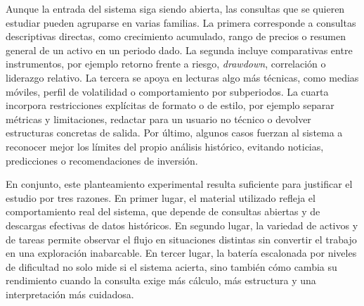Aunque la entrada del sistema siga siendo abierta, las consultas que se quieren estudiar pueden agruparse en varias familias. La primera corresponde a consultas 
descriptivas directas, como crecimiento acumulado, rango de precios o resumen general de un activo en un periodo dado. La segunda incluye comparativas entre instrumentos, 
por ejemplo retorno frente a riesgo, \textit{drawdown}, correlaci\'on o liderazgo relativo. La tercera se apoya en lecturas algo m\'as t\'ecnicas, como medias m\'oviles, 
perfil de volatilidad o comportamiento por subperiodos. La cuarta incorpora restricciones expl\'icitas de formato o de estilo, por ejemplo separar m\'etricas y 
limitaciones, redactar para un usuario no t\'ecnico o devolver estructuras concretas de salida. Por \'ultimo, algunos casos fuerzan al sistema a reconocer mejor los 
l\'imites del propio an\'alisis hist\'orico, evitando noticias, predicciones o recomendaciones de inversi\'on.

En conjunto, este planteamiento experimental resulta suficiente para justificar el estudio por tres razones. En primer lugar, el material utilizado refleja el 
comportamiento real del sistema, que depende de consultas abiertas y de descargas efectivas de datos hist\'oricos. En segundo lugar, la variedad de activos y de tareas 
permite observar el flujo en situaciones distintas sin convertir el trabajo en una exploraci\'on inabarcable. En tercer lugar, la bater\'ia escalonada por niveles de 
dificultad no solo mide si el sistema acierta, sino tambi\'en c\'omo cambia su rendimiento cuando la consulta exige m\'as c\'alculo, m\'as estructura y una 
interpretaci\'on m\'as cuidadosa.
